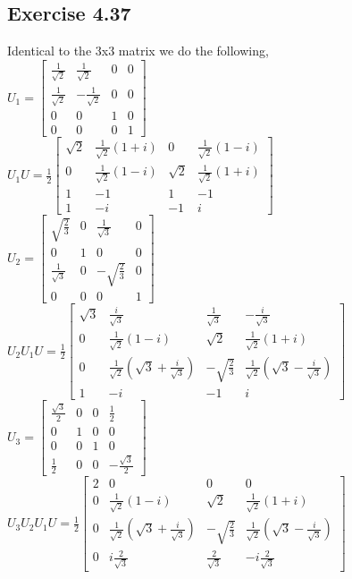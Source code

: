 \documentclass[a4paper,12pt]{article}
\begin{document}
\subsection*{Exercise 4.37}
Identical to the 3x3 matrix we do the following,\\
$U_1=\begin{bmatrix}
    \frac{1}{\sqrt{2}}&\frac{1}{\sqrt{2}}&0&0\\
    \frac{1}{\sqrt{2}}&-\frac{1}{\sqrt{2}}&0&0\\
    0&0&1&0\\
    0&0&0&1
\end{bmatrix}$\\
$U_1U=\frac{1}{2}\begin{bmatrix}
    \sqrt{2}&\frac{1}{\sqrt{2}}(1+i)&0&\frac{1}{\sqrt{2}}(1-i)\\
    0&\frac{1}{\sqrt{2}}(1-i)&\sqrt{2}&\frac{1}{\sqrt{2}}(1+i)\\
    1&-1&1&-1\\
    1&-i&-1&i
\end{bmatrix}$\\
$U_2=\begin{bmatrix}
    \sqrt{\frac{2}{3}}&0&\frac{1}{\sqrt{3}}&0\\
    0&1&0&0\\
    \frac{1}{\sqrt{3}}&0&-\sqrt{\frac{2}{3}}&0\\
    0&0&0&1
\end{bmatrix}$\\
$U_2U_1U=\frac{1}{2}\begin{bmatrix}
    \sqrt{3}&\frac{i}{\sqrt{3}}&\frac{1}{\sqrt{3}}&-\frac{i}{\sqrt{3}}\\
    0&\frac{1}{\sqrt{2}}(1-i)&\sqrt{2}&\frac{1}{\sqrt{2}}(1+i)\\
    0&\frac{1}{\sqrt{2}}(\sqrt{3}+\frac{i}{\sqrt{3}})&-\sqrt{\frac{2}{3}}&\frac{1}{\sqrt{2}}(\sqrt{3}-\frac{i}{\sqrt{3}})\\
    1&-i&-1&i
\end{bmatrix}$\\
$U_3=\begin{bmatrix}
    \frac{\sqrt{3}}{2}&0&0&\frac{1}{2}\\
    0&1&0&0\\
    0&0&1&0\\
    \frac{1}{2}&0&0&-\frac{\sqrt{3}}{2}
\end{bmatrix}$\\
$U_3U_2U_1U=\frac{1}{2}\begin{bmatrix}
    2&0&0&0\\
    0&\frac{1}{\sqrt{2}}(1-i)&\sqrt{2}&\frac{1}{\sqrt{2}}(1+i)\\
    0&\frac{1}{\sqrt{2}}(\sqrt{3}+\frac{i}{\sqrt{3}})&-\sqrt{\frac{2}{3}}&\frac{1}{\sqrt{2}}(\sqrt{3}-\frac{i}{\sqrt{3}})\\
    0&i\frac{2}{\sqrt{3}}&\frac{2}{\sqrt{3}}&-i\frac{2}{\sqrt{3}}
\end{bmatrix}$\\
\end{document}
